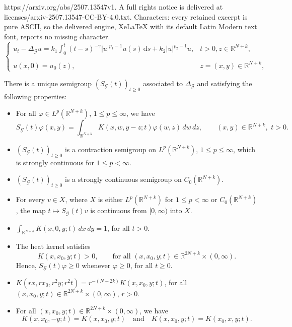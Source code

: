 \documentclass[10pt,a4paper]{amsart}
\def\R{{\mathbb {R}}}
\newcommand{\abs}[1]{\lvert#1\rvert}
\begin{document}
https://arxiv.org/abs/2507.13547v1. A full rights notice is delivered at licenses/arxiv-2507.13547-CC-BY-4.0.txt. Characters: every retained excerpt is pure ASCII, so the delivered engine, XeLaTeX with its default Latin Modern text font, reports no missing character.
\begin{equation}\label{*}
	\left\{\begin{array}{ll}
		\displaystyle {u_{t}-\Delta_{\mathcal{G}}
			u = k_1 \int_0^t(t-s)^{-\gamma}\abs{u}^{p_1-1}u(s)\,\mathrm{d}s} + k_2|u|^{p_2-1}u, &\displaystyle {t>0,z\in {\mathbb{R}}^{N+k},}\\
		{}\\
		\displaystyle{u(x,0)=  u_0(z),\qquad\qquad}&\displaystyle{z=(x,y)\in {\mathbb{R}}^{N+k},}
	\end{array}
	\right.
\end{equation}

\begin{proposition}\label{properties}
	There is a unique semigroup $(S_{\mathcal{G}}(t))_{t\geq0}$ associated to $\Delta_{\mathcal{G}}$ and satisfying the following properties:
	\begin{itemize}
		\item[$(i)$]  For all $\varphi\in L^p(\R^{N+k})$, $1\leq p\leq \infty$, we have
		$$S_{\mathcal{G}}(t)\varphi(x,y)=\int_{\R^{N+k}} K(x,w,y-z;t) \varphi(w,z)\,dw\,dz,\qquad (x,y)\in \R^{N+k},\,\,t>0.$$
		\item[$(ii)$] $(S_\mathcal{G}(t))_{t\geq0}$ is a contraction semigroup on $L^p(\mathbb{R}^{N+k})$, $1\leq p\leq \infty$, which is strongly continuous for $1\leq p<\infty$. 
		\item[$(iii)$] $(S_\mathcal{G}(t))_{t\geq0}$  is a strongly continuous semigroup on $C_0(\mathbb{R}^{N+k})$.
		\item[$(iv)$] For every $v\in X$, where $X$ is either $L^p(\mathbb{R}^{N+k})$ for $1\leq p< \infty$ or $C_0(\mathbb{R}^{N+k})$, the map $t\longmapsto S_\mathcal{G}(t)v$ is continuous from $[0,\infty)$ into $X$.
		\item[$(v)$] $\displaystyle\int_{\mathbb{R}^{N+k}}K(x,0,y;t)  \,dx\,dy=1$, for all $t>0$.
		\item[$(vi)$] The heat kernel satisfies
		$$K(x,x_0,y;t)>0,\qquad \textrm{for all}\,\, (x, x_0,y;t)\in\R^{2N+k}\times(0,\infty).$$
		Hence, $S_\mathcal{G}(t)\varphi\geq 0$ whenever $\varphi\geq0$, for all $t\geq0$.
		\item[$(vii)$] $K(rx,rx_0,r^2y;r^2t)=r^{-(N+2k)}K(x,x_0,y;t)$, for all $(x, x_0,y;t)\in\R^{2N+k}\times(0,\infty)$, $r>0$.
		\item[$(viii)$]  For all $(x, x_0,y;t)\in\R^{2N+k}\times(0,\infty)$, we have
		$$K(x,x_0,-y;t)=K(x,x_0,y;t)\quad\mathrm{and}\quad K(x,x_0,y;t)=K(x_0,x,y;t).$$
	\end{itemize}
\end{proposition} 
\end{document}
